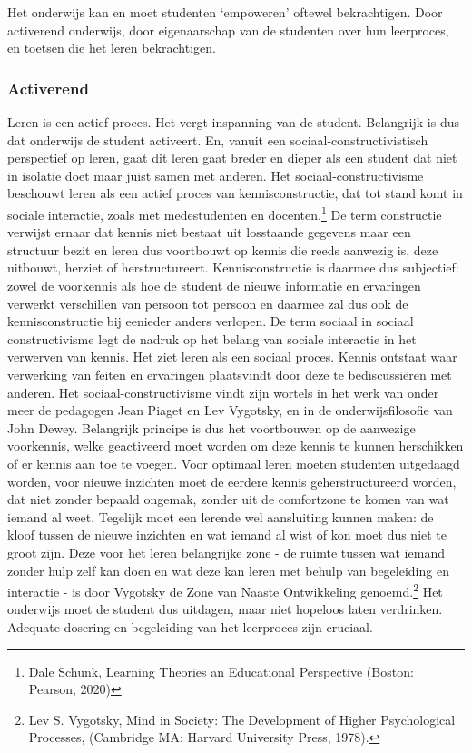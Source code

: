 \documentclass[empirical, authordate, ]{new-jote-article}
\begin{document}
	Het onderwijs kan en moet studenten ‘empoweren' oftewel bekrachtigen. Door activerend onderwijs, door eigenaarschap van de studenten over hun leerproces, en toetsen die het leren bekrachtigen.



	\subsubsection{Activerend}



	Leren is een actief proces. Het vergt inspanning van de student. Belangrijk is dus dat onderwijs de student activeert. En, vanuit een sociaal-constructivistisch perspectief op leren, gaat dit leren gaat breder en dieper als een student dat niet in isolatie doet maar juist samen met anderen. Het sociaal-constructivisme beschouwt leren als een actief proces van kennisconstructie, dat tot stand komt in sociale interactie, zoals met medestudenten en docenten.\footnote{Dale Schunk, Learning Theories an Educational Perspective (Boston: Pearson, 2020)} De term constructie verwijst ernaar dat kennis niet bestaat uit losstaande gegevens maar een structuur bezit en leren dus voortbouwt op kennis die reeds aanwezig is, deze uitbouwt, herziet of herstructureert. Kennisconstructie is daarmee dus subjectief: zowel de voorkennis als hoe de student de nieuwe informatie en ervaringen verwerkt verschillen van persoon tot persoon en daarmee zal dus ook de kennisconstructie bij eenieder anders verlopen. De term sociaal in sociaal constructivisme legt de nadruk op het belang van sociale interactie in het verwerven van kennis. Het ziet leren als een sociaal proces. Kennis ontstaat waar verwerking van feiten en ervaringen plaatsvindt door deze te bediscussiëren met anderen. Het sociaal-constructivisme vindt zijn wortels in het werk van onder meer de pedagogen Jean Piaget en Lev Vygotsky, en in de onderwijsfilosofie van John Dewey. Belangrijk principe is dus het voortbouwen op de aanwezige voorkennis, welke geactiveerd moet worden om deze kennis te kunnen herschikken of er kennis aan toe te voegen. Voor optimaal leren moeten studenten uitgedaagd worden, voor nieuwe inzichten moet de eerdere kennis geherstructureerd worden, dat niet zonder bepaald ongemak, zonder uit de comfortzone te komen van wat iemand al weet. Tegelijk moet een lerende wel aansluiting kunnen maken: de kloof tussen de nieuwe inzichten en wat iemand al wist of kon moet dus niet te groot zijn. Deze voor het leren belangrijke zone - de ruimte tussen wat iemand zonder hulp zelf kan doen en wat deze kan leren met behulp van begeleiding en interactie - is door Vygotsky de Zone van Naaste Ontwikkeling genoemd.\footnote{Lev S. Vygotsky, Mind in Society: The Development of Higher Psychological Processes, (Cambridge MA: Harvard University Press, 1978).} Het onderwijs moet de student dus uitdagen, maar niet hopeloos laten verdrinken. Adequate dosering en begeleiding van het leerproces zijn cruciaal.
\end{document}
